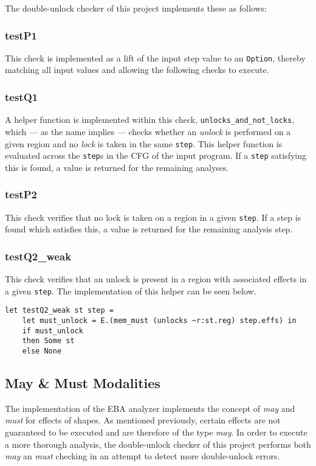 \newpar The double-unlock checker of this project implements these as follows: 

\subsubsection{testP1}
This check is implemented as a lift of the input step value to an \texttt{Option}, thereby matching all input values and allowing the following checks to execute.

\subsubsection{testQ1}
A helper function is implemented within this check, \texttt{unlocks\_and\_not\_locks}, which --- as the name implies --- checks whether an \textit{unlock} is performed on a given region and no \textit{lock} is taken in the same \texttt{step}. This helper function is evaluated across the \texttt{step}s in the CFG of the input program. If a \texttt{step} satisfying this is found, a value is returned for the remaining analyses. 

\subsubsection{testP2}
This check verifies that no lock is taken on a region in a given \texttt{step}. If a step is found which satisfies this, a value is returned for the remaining analysis step. 

\subsubsection{testQ2\_weak}
This check verifies that an unlock is present in a region with associated effects in a given \texttt{step}. The implementation of this helper can be seen below. 

\begin{verbatim}
let testQ2_weak st step =
    let must_unlock = E.(mem_must (unlocks ~r:st.reg) step.effs) in
    if must_unlock
    then Some st
    else None
\end{verbatim}

\subsection{May \& Must Modalities}
\newpar The implementation of the EBA analyzer implements the concept of \textit{may} and \textit{must} for effects of shapes. As mentioned previously, certain effects are not guaranteed to be executed and are therefore of the type \textit{may}. In order to execute a more thorough analysis, the double-unlock checker of this project performs both \textit{may} an \textit{must} checking in an attempt to detect more double-unlock errors. 

